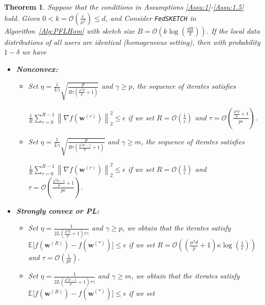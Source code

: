 \documentclass{article}
\newtheorem{theorem}{Theorem}
\begin{document}
\begin{theorem}\label{thm:homog_case}
  Suppose that the conditions in Assumptions \ref{Assu:1}-\ref{Assu:1.5} hold. Given $0<k=\mathcal{O}\left(\frac{e}{\mu^2}\right)\leq d$, and Consider \texttt{FedSKETCH} in Algorithm~\ref{Alg:PFLHom} with sketch size $B=\mathcal{O}\left(k\log\left(\frac{d R}{\delta}\right)\right)$. If the local data distributions of all users are identical (homogeneous setting), then with probability $1-\delta$ we have  
 \begin{itemize}
     \item \textbf{Nonconvex:}  
     \begin{itemize}
         \item [\texttt{PRIVIX}] Set $\eta=\frac{1}{L\gamma}\sqrt{\frac{p}{R\tau\left(\frac{\mu^2d}{p}+1\right)}}$ and $\gamma\geq p$, the sequence of iterates satisfies 
         
          $\frac{1}{R}\sum_{r=0}^{R-1}\left\|\nabla f({\boldsymbol{w}}^{(r)})\right\|_2^2\leq {\epsilon}$ if we set
     $R=\mathcal{O}\left(\frac{1}{\epsilon}\right)$ and $ \tau=\mathcal{O}\left(\frac{\frac{\mu^2d}{p}+1}{{p}\epsilon}\right)$.
         \item [\texttt{HEAPRIX}] Set 
$\eta=\frac{1}{L\gamma}\sqrt{\frac{p}{R\tau\left(\frac{\mu^2d-1}{p}+1\right)}}$ and $\gamma\geq m$, the sequence of iterates satisfies  

$\frac{1}{R}\sum_{r=0}^{R-1}\left\|\nabla f({\boldsymbol{w}}^{(r)})\right\|_2^2\leq {\epsilon}$ if we set
     $R=\mathcal{O}\left(\frac{1}{\epsilon}\right)$ and $ \tau=\mathcal{O}\left(\frac{\frac{\mu^2d-1}{p}+1}{{p}\epsilon}\right)$. 
     \end{itemize}
     
     \item \textbf{Strongly convex or PL:}
      \begin{itemize}
         \item [\texttt{PRIVIX}] Set $\eta=\frac{1}{2L\left(\frac{\mu^2d}{p}+1\right)\tau\gamma}$ and $\gamma\geq p$, we obtain that the iterates satisfy $\mathbb{E}\Big[f({\boldsymbol{w}}^{(R)})-f({\boldsymbol{w}}^{(*)})\Big]\leq \epsilon$ if  we set
     $R=\mathcal{O}\left(\left(\frac{\mu^2d}{p}+1\right)\kappa\log\left(\frac{1}{\epsilon}\right)\right)$ and $ \tau=\mathcal{O}\left(\frac{1}{p\epsilon}\right)$.
          
         \item [\texttt{HEAPRIX}] Set $\eta=\frac{1}{2L\left(\frac{\mu^2d-1}{p}+1\right)\tau\gamma}$ and $\gamma\geq m$, we obtain that the iterates satisfy $\mathbb{E}\Big[f({\boldsymbol{w}}^{(R)})-f({\boldsymbol{w}}^{(*)})\Big]\leq \epsilon$ if  we set


\end{itemize}
\end{itemize}
\end{theorem}
\end{document}
